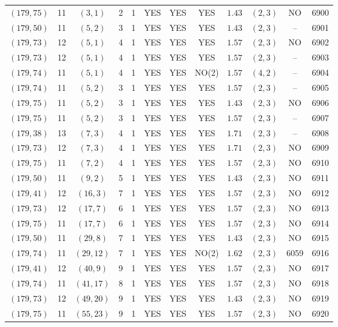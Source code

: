 \begin{longtable}{|c|c|c|c|c|c|c|c|c|c|c|c|}
$(179,75)$ & 11 & $(3,1)$ & 2 & 1 & YES & YES & YES & $1.43$ & $(2,3)$ & NO & 6900\\
$(179,50)$ & 11 & $(5,2)$ & 3 & 1 & YES & YES & YES & $1.43$ & $(2,3)$ & -- & 6901\\
$(179,73)$ & 12 & $(5,1)$ & 4 & 1 & YES & YES & YES & $1.57$ & $(2,3)$ & NO & 6902\\
$(179,73)$ & 12 & $(5,1)$ & 4 & 1 & YES & YES & YES & $1.57$ & $(2,3)$ & -- & 6903\\
$(179,74)$ & 11 & $(5,1)$ & 4 & 1 & YES & YES & NO(2) & $1.57$ & $(4,2)$ & -- & 6904\\
$(179,74)$ & 11 & $(5,2)$ & 3 & 1 & YES & YES & YES & $1.57$ & $(2,3)$ & -- & 6905\\
$(179,75)$ & 11 & $(5,2)$ & 3 & 1 & YES & YES & YES & $1.43$ & $(2,3)$ & NO & 6906\\
$(179,75)$ & 11 & $(5,2)$ & 3 & 1 & YES & YES & YES & $1.57$ & $(2,3)$ & -- & 6907\\
$(179,38)$ & 13 & $(7,3)$ & 4 & 1 & YES & YES & YES & $1.71$ & $(2,3)$ & -- & 6908\\
$(179,73)$ & 12 & $(7,3)$ & 4 & 1 & YES & YES & YES & $1.71$ & $(2,3)$ & NO & 6909\\
$(179,75)$ & 11 & $(7,2)$ & 4 & 1 & YES & YES & YES & $1.57$ & $(2,3)$ & NO & 6910\\
$(179,50)$ & 11 & $(9,2)$ & 5 & 1 & YES & YES & YES & $1.43$ & $(2,3)$ & NO & 6911\\
$(179,41)$ & 12 & $(16,3)$ & 7 & 1 & YES & YES & YES & $1.57$ & $(2,3)$ & NO & 6912\\
$(179,73)$ & 12 & $(17,7)$ & 6 & 1 & YES & YES & YES & $1.57$ & $(2,3)$ & NO & 6913\\
$(179,75)$ & 11 & $(17,7)$ & 6 & 1 & YES & YES & YES & $1.57$ & $(2,3)$ & NO & 6914\\
$(179,50)$ & 11 & $(29,8)$ & 7 & 1 & YES & YES & YES & $1.43$ & $(2,3)$ & NO & 6915\\
$(179,74)$ & 11 & $(29,12)$ & 7 & 1 & YES & YES & NO(2) & $1.62$ & $(2,3)$ & 6059 & 6916\\
$(179,41)$ & 12 & $(40,9)$ & 9 & 1 & YES & YES & YES & $1.57$ & $(2,3)$ & NO & 6917\\
$(179,74)$ & 11 & $(41,17)$ & 8 & 1 & YES & YES & YES & $1.57$ & $(2,3)$ & NO & 6918\\
$(179,73)$ & 12 & $(49,20)$ & 9 & 1 & YES & YES & YES & $1.43$ & $(2,3)$ & NO & 6919\\
$(179,75)$ & 11 & $(55,23)$ & 9 & 1 & YES & YES & YES & $1.57$ & $(2,3)$ & NO & 6920\\

\end{longtable}

